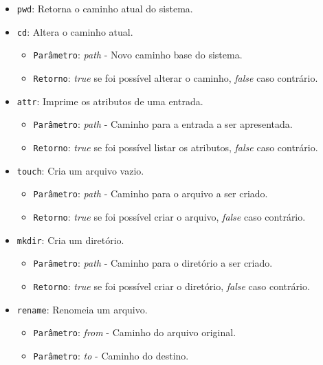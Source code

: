 \documentclass[
    12pt,				%
    oneside,   	        %
    a4paper,			%
    english,			%
    french,				%
    spanish,			%
    brazil,				%
    ]{pacotes/abntex2}
\begin{document}
\begin{itemize}
\begin{itemize}
\begin{itemize}
            \end{itemize}
            \item \texttt{pwd}: Retorna o caminho atual do sistema.
            \item \texttt{cd}: Altera o caminho atual.
            \begin{itemize}
                \item \texttt{Parâmetro}: \textit{path} - Novo caminho base do sistema.
                \item \texttt{Retorno}: \textit{true} se foi possível alterar o caminho, \textit{false} caso contrário.
            \end{itemize}
            \item \texttt{attr}: Imprime os atributos de uma entrada.
            \begin{itemize}
                \item \texttt{Parâmetro}: \textit{path} - Caminho para a entrada a ser apresentada.
                \item \texttt{Retorno}: \textit{true} se foi possível listar os atributos, \textit{false} caso contrário.
            \end{itemize}
            \item \texttt{touch}: Cria um arquivo vazio.
            \begin{itemize}
                \item \texttt{Parâmetro}: \textit{path} - Caminho para o arquivo a ser criado.
                \item \texttt{Retorno}: \textit{true} se foi possível criar o arquivo, \textit{false} caso contrário.
            \end{itemize}
            \item \texttt{mkdir}: Cria um diretório.
            \begin{itemize}
                \item \texttt{Parâmetro}: \textit{path} - Caminho para o diretório a ser criado.
                \item \texttt{Retorno}: \textit{true} se foi possível criar o diretório, \textit{false} caso contrário.
            \end{itemize}
            \item \texttt{rename}: Renomeia um arquivo.
            \begin{itemize}
                \item \texttt{Parâmetro}: \textit{from} - Caminho do arquivo original.
                \item \texttt{Parâmetro}: \textit{to} - Caminho do destino.

\end{itemize}
\end{itemize}
\end{itemize}
\end{document}
